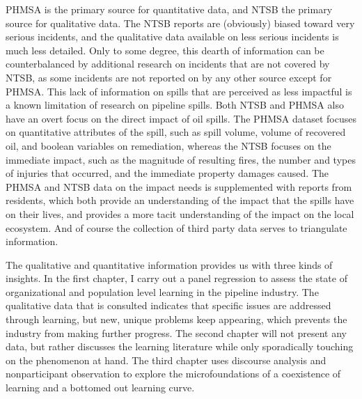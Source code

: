 PHMSA is the primary source for quantitative data, and NTSB the primary source for qualitative data. The NTSB reports are (obviously) biased toward very serious incidents, and the qualitative data available on less serious incidents is much less detailed. Only to some degree, this dearth of information can be counterbalanced by additional research on incidents that are not covered by NTSB, as some incidents are not reported on by any other source except for PHMSA. This lack of information on spills that are perceived as less impactful is a known limitation of research on pipeline spills. Both NTSB and PHMSA also have an overt focus on the direct impact of oil spills. The PHMSA dataset focuses on quantitative attributes of the spill, such as spill volume, volume of recovered oil, and boolean variables on remediation, whereas the NTSB focuses on the immediate impact, such as the magnitude of resulting fires, the number and types of injuries that occurred, and the immediate property damages caused. The PHMSA and NTSB data on the impact needs is supplemented with reports from residents, which both provide an understanding of the impact that the spills have on their lives, and provides a more tacit understanding of the impact on the local ecosystem. And of course the collection of third party data serves to triangulate information.


The qualitative and quantitative information provides us with three kinds of insights. In the first chapter, I carry out a panel regression to assess the state of organizational and population level learning in the pipeline industry. The qualitative data that is consulted indicates that specific issues are addressed through learning, but new, unique problems keep appearing, which prevents the industry from making further progress. The second chapter will not present any data, but rather discusses the learning literature while only sporadically touching on the phenomenon at hand. The third chapter uses discourse analysis and nonparticipant observation to explore the microfoundations of a coexistence of learning and a bottomed out learning curve.